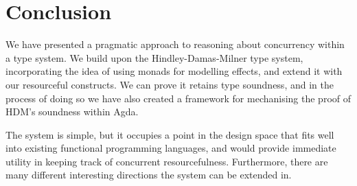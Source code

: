 \documentclass{report}
\begin{document}
\chapter{Conclusion}
We have presented a pragmatic approach to reasoning about concurrency within a
type system. We build upon the Hindley-Damas-Milner type system, incorporating
the idea of using monads for modelling effects, and extend it with our
resourceful constructs. We can prove it retains type soundness, and in the
process of doing so we have also created a framework for mechanising the proof
of HDM's soundness within Agda.

The system is simple, but it occupies a point in the design space that fits well
into existing functional programming languages, and would provide immediate
utility in keeping track of concurrent resourcefulness. Furthermore, there are
many different interesting directions the system can be extended in.





\end{document}
